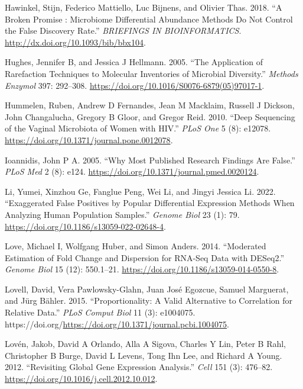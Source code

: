 \documentclass[
]{article}
\newlength{\cslhangindent}
\newlength{\cslentryspacingunit} %
\newenvironment{CSLReferences}[2] %
 {%
  \setlength{\parindent}{0pt}
  \ifodd #1
  \let\oldpar\par
  \def\par{\hangindent=\cslhangindent\oldpar}
  \fi
  \setlength{\parskip}{#2\cslentryspacingunit}
 }%
 {}
\begin{document}
\begin{CSLReferences}{1}{0}
\leavevmode{}%
Hawinkel, Stijn, Federico Mattiello, Luc Bijnens, and Olivier Thas.
2018. {``A Broken Promise : Microbiome Differential Abundance Methods Do
Not Control the False Discovery Rate.''} \emph{BRIEFINGS IN
BIOINFORMATICS}. \url{http://dx.doi.org/10.1093/bib/bbx104}.

\leavevmode{}%
Hughes, Jennifer B, and Jessica J Hellmann. 2005. {``The Application of
Rarefaction Techniques to Molecular Inventories of Microbial
Diversity.''} \emph{Methods Enzymol} 397: 292--308.
\url{https://doi.org/10.1016/S0076-6879(05)97017-1}.

\leavevmode{}%
Hummelen, Ruben, Andrew D Fernandes, Jean M Macklaim, Russell J Dickson,
John Changalucha, Gregory B Gloor, and Gregor Reid. 2010. {``Deep
Sequencing of the Vaginal Microbiota of Women with {HIV}.''} \emph{PLoS
One} 5 (8): e12078. \url{https://doi.org/10.1371/journal.pone.0012078}.

\leavevmode{}%
Ioannidis, John P A. 2005. {``Why Most Published Research Findings Are
False.''} \emph{PLoS Med} 2 (8): e124.
\url{https://doi.org/10.1371/journal.pmed.0020124}.

\leavevmode{}%
Li, Yumei, Xinzhou Ge, Fanglue Peng, Wei Li, and Jingyi Jessica Li.
2022. {``Exaggerated False Positives by Popular Differential Expression
Methods When Analyzing Human Population Samples.''} \emph{Genome Biol}
23 (1): 79. \url{https://doi.org/10.1186/s13059-022-02648-4}.

\leavevmode{}%
Love, Michael I, Wolfgang Huber, and Simon Anders. 2014. {``Moderated
Estimation of Fold Change and Dispersion for RNA-Seq Data with
DESeq2.''} \emph{Genome Biol} 15 (12): 550.1--21.
\url{https://doi.org/10.1186/s13059-014-0550-8}.

\leavevmode{}%
Lovell, David, Vera Pawlowsky-Glahn, Juan José Egozcue, Samuel
Marguerat, and Jürg Bähler. 2015. {``Proportionality: A Valid
Alternative to Correlation for Relative Data.''} \emph{PLoS Comput Biol}
11 (3): e1004075.
https://doi.org/\url{https://doi.org/10.1371/journal.pcbi.1004075}.

\leavevmode{}%
Lovén, Jakob, David A Orlando, Alla A Sigova, Charles Y Lin, Peter B
Rahl, Christopher B Burge, David L Levens, Tong Ihn Lee, and Richard A
Young. 2012. {``Revisiting Global Gene Expression Analysis.''}
\emph{Cell} 151 (3): 476--82.
\url{https://doi.org/10.1016/j.cell.2012.10.012}.


\end{CSLReferences}
\end{document}

